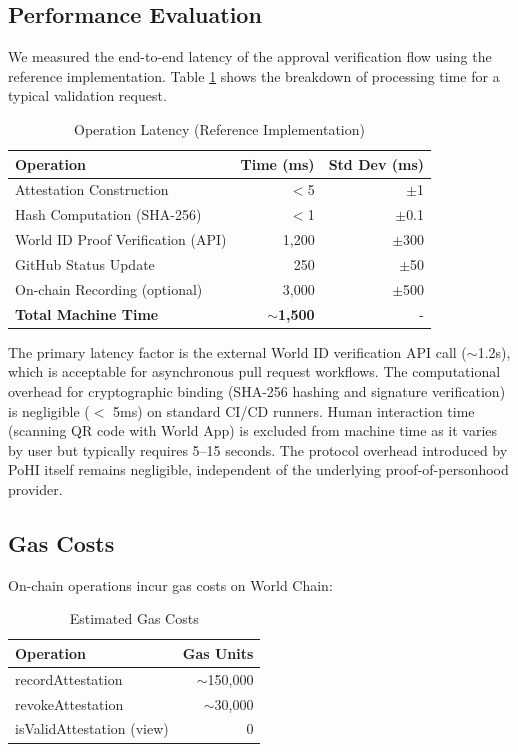 \documentclass[conference]{IEEEtran}
\begin{document}
\subsection{Performance Evaluation}

We measured the end-to-end latency of the approval verification flow using the reference implementation.
Table \ref{tab:latency} shows the breakdown of processing time for a typical validation request.

\begin{table}[h]
\centering
\caption{Operation Latency (Reference Implementation)}
\label{tab:latency}
\begin{tabular}{lrr}
\toprule
\textbf{Operation} & \textbf{Time (ms)} & \textbf{Std Dev (ms)} \\
\midrule
Attestation Construction & $<$5 & $\pm$1 \\
Hash Computation (SHA-256) & $<$1 & $\pm$0.1 \\
World ID Proof Verification (API) & 1,200 & $\pm$300 \\
GitHub Status Update & 250 & $\pm$50 \\
On-chain Recording (optional) & 3,000 & $\pm$500 \\
\midrule
\textbf{Total Machine Time} & \textbf{$\sim$1,500} & - \\
\bottomrule
\end{tabular}
\end{table}

The primary latency factor is the external World ID verification API call ($\sim$1.2s), which is acceptable for asynchronous pull request workflows.
The computational overhead for cryptographic binding (SHA-256 hashing and signature verification) is negligible ($<$ 5ms) on standard CI/CD runners.
Human interaction time (scanning QR code with World App) is excluded from machine time as it varies by user but typically requires 5--15 seconds.
The protocol overhead introduced by PoHI itself remains negligible, independent of the underlying proof-of-personhood provider.

\subsection{Gas Costs}

On-chain operations incur gas costs on World Chain:

\begin{table}[h]
\centering
\caption{Estimated Gas Costs}
\begin{tabular}{lr}
\toprule
\textbf{Operation} & \textbf{Gas Units} \\
\midrule
recordAttestation & $\sim$150,000 \\
revokeAttestation & $\sim$30,000 \\
isValidAttestation (view) & 0 \\
\bottomrule
\end{tabular}
\end{table}
\end{document}
